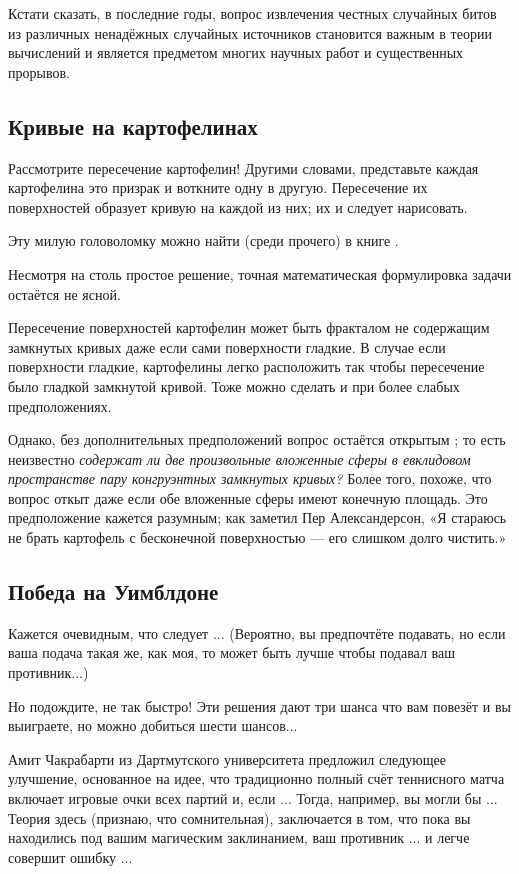Кстати сказать, в последние годы, вопрос извлечения честных случайных битов из различных ненадёжных случайных источников становится важным в теории вычислений и является предметом многих научных работ и существенных прорывов.

\subsection*{Кривые на картофелинах}

Рассмотрите пересечение картофелин!
Другими словами, представьте каждая картофелина это призрак и воткните одну в другую.
Пересечение их поверхностей образует кривую на каждой из них; их и следует нарисовать.

Эту милую головоломку можно найти (среди прочего) в книге \cite{berlekamp-rodgers}.

\begin{addedbytheeditors}
Несмотря на столь простое решение, точная математическая формулировка задачи остаётся не ясной.

Пересечение поверхностей картофелин может быть фракталом не содержащим замкнутых кривых даже если сами поверхности гладкие.
В случае если поверхности гладкие, картофелины легко расположить так чтобы пересечение было гладкой замкнутой кривой.
Тоже можно сделать и при более слабых предположениях.

Однако, без дополнительных предположений вопрос остаётся открытым \cite{agol};
то есть неизвестно \emph{содержат ли две произвольные вложенные сферы в евклидовом пространстве пару конгруэнтных замкнутых кривых?} 
Более того, похоже, что вопрос откыт даже если обе вложенные сферы имеют конечную площадь.
Это предположение кажется разумным; как заметил Пер Александерсон,
«Я стараюсь не брать картофель с бесконечной поверхностью --- его слишком долго чистить.»
\end{addedbytheeditors}

\subsection*{Победа на Уимблдоне}

Кажется очевидным, что следует ...
(Вероятно, вы предпочтёте подавать, но если ваша подача такая же, как моя, то может быть лучше чтобы подавал ваш противник...)

Но подождите, не так быстро!
Эти решения дают три шанса что вам повезёт и вы выиграете, но можно добиться шести шансов...

Амит Чакрабарти из Дартмутского университета предложил следующее улучшение, основанное на идее, что традиционно полный счёт теннисного матча включает игровые очки всех партий и, если ...
Тогда, например, вы могли бы ...
Теория здесь (признаю, что сомнительная), заключается в том, что пока вы находились под вашим магическим заклинанием, ваш противник ... и легче совершит ошибку ...

